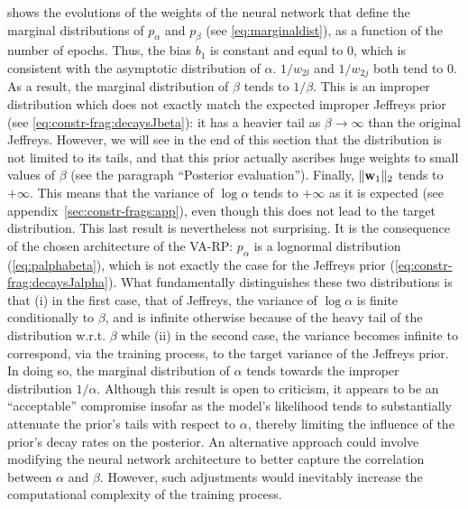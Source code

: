  shows the evolutions of the weights of the neural network that define the marginal distributions of $p_\alpha$ and $p_\beta$ (see \cref{eq:marginaldist}), as a function of the number of epochs. Thus, the bias $b_1$ is constant and equal to $0$, which is consistent with the asymptotic distribution of $\alpha$. $1/w_{2l}$ and $1/w_{2j}$ both tend to 0. As a result, the marginal distribution of $\beta$ tends to $1/\beta$. This is an improper distribution which does not exactly match the expected improper Jeffreys prior (see \cref{eq:constr-frag:decaysJbeta}): it has a heavier tail as $\beta\to\infty$ than the original Jeffreys. However, we will see in the end of this section that the distribution is not limited to its tails, and that this prior actually ascribes huge weights to small values of $\beta$ (see the paragraph ``Posterior evaluation''). Finally, $\|\mathbf{w}_1\|_2$ tends to $+\infty$. This means that the variance of  $\log\alpha$ tends to $+\infty$ as it is expected (see appendix~\ref{sec:constr-frags:app}), even though this does not lead to the target distribution. This last result is nevertheless not surprising. It is the consequence of the chosen architecture of the VA-RP: $p_\alpha$ is a lognormal distribution (\cref{eq:palphabeta}), which is not exactly the case for the Jeffreys prior (\cref{eq:constr-frag:decaysJalpha}). What fundamentally distinguishes these two distributions is that (i) in the first case, that of Jeffreys, the variance of $\log\alpha$ is finite conditionally to $\beta$, and is infinite otherwise because of the heavy tail of the distribution w.r.t. $\beta$ %
while (ii) in the second case, the variance becomes infinite to correspond, via the training process, to the target variance of the Jeffreys prior. In doing so, the marginal distribution of $\alpha$ tends towards the improper distribution $1/\alpha$. Although this result is open to criticism, it appears to be an ``acceptable'' compromise insofar as the model's likelihood tends to substantially attenuate the prior's tails with respect to $\alpha$, thereby limiting the influence of the prior's decay rates on the posterior. An alternative approach could involve modifying the neural network architecture to better capture the correlation between $\alpha$ and $\beta$. However, such adjustments would inevitably increase the computational complexity of the training process.


